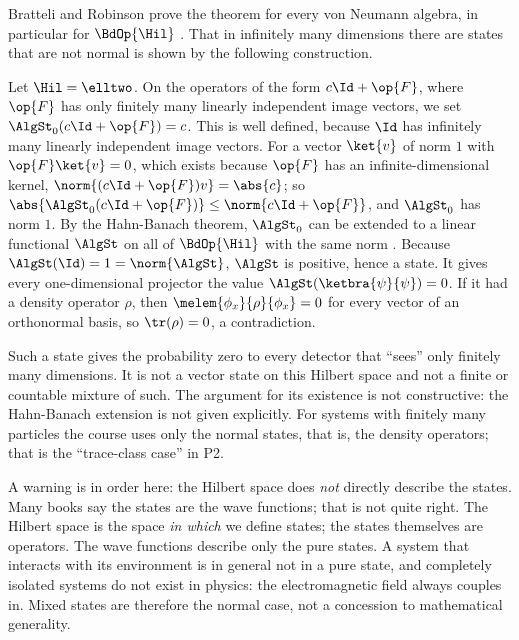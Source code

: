 \begin{vertiefung}
  Bratteli and Robinson prove the theorem for every von Neumann algebra, in particular for
  $\BdOp{\Hil}$ . That in infinitely many dimensions there are
  states that are not normal is shown by the following construction.

  \begin{example}\label{c04.ex.singulaer}
    Let $\Hil = \elltwo$. On the operators of the form $c\Id + \op{F}$, where $\op{F}$ has only
    finitely many linearly independent image vectors, we set $\AlgSt_0(c\Id + \op{F}) = c$. This is
    well defined, because $\Id$ has infinitely many linearly independent image vectors. For a
    vector $\ket{v}$ of norm $1$ with $\op{F}\ket{v} = 0$, which exists because $\op{F}$ has an
    infinite-dimensional kernel, $\norm{(c\Id + \op{F})v} = \abs{c}$; so
    $\abs{\AlgSt_0(c\Id + \op{F})} \leq \norm{c\Id + \op{F}}$, and $\AlgSt_0$ has norm $1$. By the
    Hahn-Banach theorem, $\AlgSt_0$ can be extended to a linear functional $\AlgSt$ on all of
    $\BdOp{\Hil}$ with the same norm . Because
    $\AlgSt(\Id) = 1 = \norm{\AlgSt}$, $\AlgSt$ is positive, hence a state. It gives every
    one-dimensional projector the value $\AlgSt(\ketbra{\psi}{\psi}) = 0$. If it had a density
    operator $\rho$, then $\melem{\phi_x}{\rho}{\phi_x} = 0$ for every vector of an orthonormal
    basis, so $\tr(\rho) = 0$, a contradiction.
  \end{example}

  Such a state gives the probability zero to every detector that ``sees'' only finitely many
  dimensions. It is not a vector state on this Hilbert space and not a finite or countable mixture
  of such. The argument for its existence is not constructive: the Hahn-Banach extension is not
  given explicitly. For systems with finitely many particles the course uses only the normal
  states, that is, the density operators; that is the ``trace-class case'' in P2.
\end{vertiefung}

A warning is in order here: the Hilbert space does \emph{not} directly describe the states. Many
books say the states are the wave functions; that is not quite right. The Hilbert space is the
space \emph{in which} we define states; the states themselves are operators. The wave functions
describe only the pure states. A system that interacts with its environment is in general not in
a pure state, and completely isolated systems do not exist in physics: the electromagnetic field
always couples in. Mixed states are therefore the normal case, not a concession to mathematical
generality.

